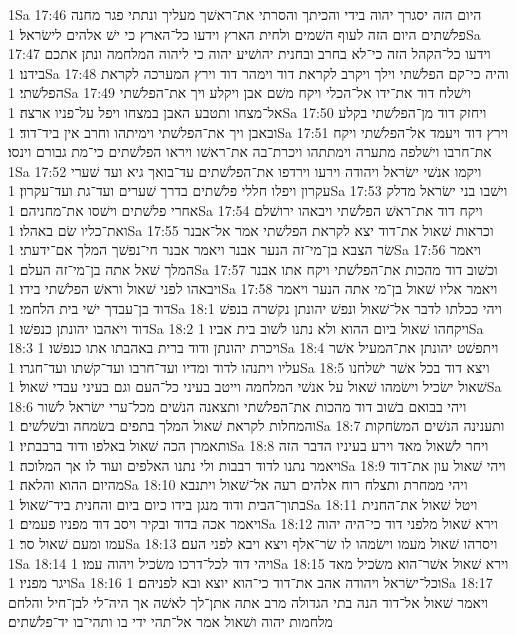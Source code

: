 1Sa 17:46  היום הזה יסגרך יהוה בידי והכיתך והסרתי את־ראשׁך מעליך ונתתי פגר מחנה פלשׁתים היום הזה לעוף השׁמים ולחית הארץ וידעו כל־הארץ כי ישׁ אלהים לישׂראל׃
1Sa 17:47  וידעו כל־הקהל הזה כי־לא בחרב ובחנית יהושׁיע יהוה כי ליהוה המלחמה ונתן אתכם בידנו׃
1Sa 17:48  והיה כי־קם הפלשׁתי וילך ויקרב לקראת דוד וימהר דוד וירץ המערכה לקראת הפלשׁתי׃
1Sa 17:49  וישׁלח דוד את־ידו אל־הכלי ויקח משׁם אבן ויקלע ויך את־הפלשׁתי אל־מצחו ותטבע האבן במצחו ויפל על־פניו ארצה׃
1Sa 17:50  ויחזק דוד מן־הפלשׁתי בקלע ובאבן ויך את־הפלשׁתי וימיתהו וחרב אין ביד־דוד׃
1Sa 17:51  וירץ דוד ויעמד אל־הפלשׁתי ויקח את־חרבו וישׁלפה מתערה וימתתהו ויכרת־בה את־ראשׁו ויראו הפלשׁתים כי־מת גבורם וינסו׃
1Sa 17:52  ויקמו אנשׁי ישׂראל ויהודה וירעו וירדפו את־הפלשׁתים עד־בואך גיא ועד שׁערי עקרון ויפלו חללי פלשׁתים בדרך שׁערים ועד־גת ועד־עקרון׃
1Sa 17:53  וישׁבו בני ישׂראל מדלק אחרי פלשׁתים וישׁסו את־מחניהם׃
1Sa 17:54  ויקח דוד את־ראשׁ הפלשׁתי ויבאהו ירושׁלם ואת־כליו שׂם באהלו׃
1Sa 17:55  וכראות שׁאול את־דוד יצא לקראת הפלשׁתי אמר אל־אבנר שׂר הצבא בן־מי־זה הנער אבנר ויאמר אבנר חי־נפשׁך המלך אם־ידעתי׃
1Sa 17:56  ויאמר המלך שׁאל אתה בן־מי־זה העלם׃
1Sa 17:57  וכשׁוב דוד מהכות את־הפלשׁתי ויקח אתו אבנר ויבאהו לפני שׁאול וראשׁ הפלשׁתי בידו׃
1Sa 17:58  ויאמר אליו שׁאול בן־מי אתה הנער ויאמר דוד בן־עבדך ישׁי בית הלחמי׃
1Sa 18:1  ויהי ככלתו לדבר אל־שׁאול ונפשׁ יהונתן נקשׁרה בנפשׁ דוד ויאהבו יהונתן כנפשׁו׃
1Sa 18:2  ויקחהו שׁאול ביום ההוא ולא נתנו לשׁוב בית אביו׃
1Sa 18:3  ויכרת יהונתן ודוד ברית באהבתו אתו כנפשׁו׃
1Sa 18:4  ויתפשׁט יהונתן את־המעיל אשׁר עליו ויתנהו לדוד ומדיו ועד־חרבו ועד־קשׁתו ועד־חגרו׃
1Sa 18:5  ויצא דוד בכל אשׁר ישׁלחנו שׁאול ישׂכיל וישׂמהו שׁאול על אנשׁי המלחמה וייטב בעיני כל־העם וגם בעיני עבדי שׁאול׃
1Sa 18:6  ויהי בבואם בשׁוב דוד מהכות את־הפלשׁתי ותצאנה הנשׁים מכל־ערי ישׂראל לשׁור והמחלות לקראת שׁאול המלך בתפים בשׂמחה ובשׁלשׁים׃
1Sa 18:7  ותענינה הנשׁים המשׂחקות ותאמרן הכה שׁאול באלפו ודוד ברבבתיו׃
1Sa 18:8  ויחר לשׁאול מאד וירע בעיניו הדבר הזה ויאמר נתנו לדוד רבבות ולי נתנו האלפים ועוד לו אך המלוכה׃
1Sa 18:9  ויהי שׁאול עון את־דוד מהיום ההוא והלאה׃
1Sa 18:10  ויהי ממחרת ותצלח רוח אלהים רעה אל־שׁאול ויתנבא בתוך־הבית ודוד מנגן בידו כיום ביום והחנית ביד־שׁאול׃
1Sa 18:11  ויטל שׁאול את־החנית ויאמר אכה בדוד ובקיר ויסב דוד מפניו פעמים׃
1Sa 18:12  וירא שׁאול מלפני דוד כי־היה יהוה עמו ומעם שׁאול סר׃
1Sa 18:13  ויסרהו שׁאול מעמו וישׂמהו לו שׂר־אלף ויצא ויבא לפני העם׃
1Sa 18:14  ויהי דוד לכל־דרכו משׂכיל ויהוה עמו׃
1Sa 18:15  וירא שׁאול אשׁר־הוא משׂכיל מאד ויגר מפניו׃
1Sa 18:16  וכל־ישׂראל ויהודה אהב את־דוד כי־הוא יוצא ובא לפניהם׃
1Sa 18:17  ויאמר שׁאול אל־דוד הנה בתי הגדולה מרב אתה אתן־לך לאשׁה אך היה־לי לבן־חיל והלחם מלחמות יהוה ושׁאול אמר אל־תהי ידי בו ותהי־בו יד־פלשׁתים׃

